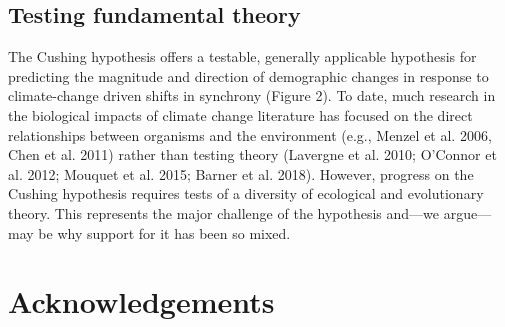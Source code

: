\documentclass[11pt,letterpaper]{article}
\begin{document}
\subsection{Testing fundamental theory}

The Cushing hypothesis offers a testable, generally applicable hypothesis for predicting the magnitude and direction of demographic changes in response to climate-change driven shifts in synchrony (Figure 2). To date, much research in the biological impacts of climate change literature has focused on the direct relationships between organisms and the environment (e.g., Menzel et al. 2006, Chen et al. 2011) rather than testing theory (Lavergne et al. 2010; O’Connor et al. 2012; Mouquet et al. 2015; Barner et al. 2018). However, progress on the Cushing hypothesis requires tests of a diversity of ecological and evolutionary theory. This represents the major challenge of the hypothesis and—we argue—may be why support for it has been so mixed. 

\section{Acknowledgements}




\end{document}
